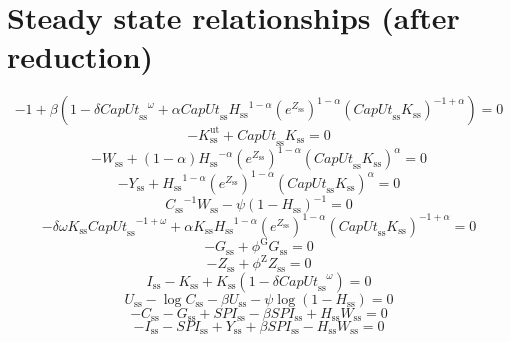 \section{Steady state relationships (after reduction)}

\begin{equation}
-1 + {\beta} \left(1 - {\delta} {{{C\!a\!p\!U\!t}_\mathrm{ss}}^{\omega}} + {\alpha} {{C\!a\!p\!U\!t}_\mathrm{ss}} {{H_\mathrm{ss}}^{1 - \alpha}} {\left(e^{Z_\mathrm{ss}}\right)^{1 - \alpha}} {\left({{C\!a\!p\!U\!t}_\mathrm{ss}} {K_\mathrm{ss}}\right)^{-1 + \alpha}}\right) = 0
\end{equation}
\begin{equation}
-K^{\mathrm{ut}}_\mathrm{ss} + {{C\!a\!p\!U\!t}_\mathrm{ss}} {K_\mathrm{ss}} = 0
\end{equation}
\begin{equation}
-W_\mathrm{ss} + \left(1 - \alpha\right) {{H_\mathrm{ss}}^{-\alpha}} {\left(e^{Z_\mathrm{ss}}\right)^{1 - \alpha}} {\left({{C\!a\!p\!U\!t}_\mathrm{ss}} {K_\mathrm{ss}}\right)^{\alpha}} = 0
\end{equation}
\begin{equation}
-Y_\mathrm{ss} + {{H_\mathrm{ss}}^{1 - \alpha}} {\left(e^{Z_\mathrm{ss}}\right)^{1 - \alpha}} {\left({{C\!a\!p\!U\!t}_\mathrm{ss}} {K_\mathrm{ss}}\right)^{\alpha}} = 0
\end{equation}
\begin{equation}
{C_\mathrm{ss}}^{-1} {W_\mathrm{ss}} - {\psi} \left(1 - H_\mathrm{ss}\right)^{-1} = 0
\end{equation}
\begin{equation}
-{\delta} {\omega} {K_\mathrm{ss}} {{{C\!a\!p\!U\!t}_\mathrm{ss}}^{-1 + \omega}} + {\alpha} {K_\mathrm{ss}} {{H_\mathrm{ss}}^{1 - \alpha}} {\left(e^{Z_\mathrm{ss}}\right)^{1 - \alpha}} {\left({{C\!a\!p\!U\!t}_\mathrm{ss}} {K_\mathrm{ss}}\right)^{-1 + \alpha}} = 0
\end{equation}
\begin{equation}
-G_\mathrm{ss} + {\phi^{\mathrm{G}}} {G_\mathrm{ss}} = 0
\end{equation}
\begin{equation}
-Z_\mathrm{ss} + {\phi^{\mathrm{Z}}} {Z_\mathrm{ss}} = 0
\end{equation}
\begin{equation}
I_\mathrm{ss} - K_\mathrm{ss} + {K_\mathrm{ss}} \left(1 - {\delta} {{{C\!a\!p\!U\!t}_\mathrm{ss}}^{\omega}}\right) = 0
\end{equation}
\begin{equation}
U_\mathrm{ss} - \log{C_\mathrm{ss}} - {\beta} {U_\mathrm{ss}} - {\psi} {\log\left(1 - H_\mathrm{ss}\right)} = 0
\end{equation}
\begin{equation}
-C_\mathrm{ss} - G_\mathrm{ss} + {S\!P\!I}_\mathrm{ss} - {\beta} {{S\!P\!I}_\mathrm{ss}} + {H_\mathrm{ss}} {W_\mathrm{ss}} = 0
\end{equation}
\begin{equation}
-I_\mathrm{ss} - {S\!P\!I}_\mathrm{ss} + Y_\mathrm{ss} + {\beta} {{S\!P\!I}_\mathrm{ss}} - {H_\mathrm{ss}} {W_\mathrm{ss}} = 0
\end{equation}







